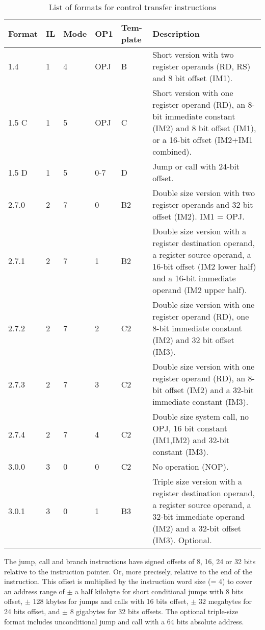 \documentclass[forwardcom.tex]{subfiles}
\begin{document}
\begin{longtable}
{|p{10mm}|p{8mm}|p{8mm}|p{8mm}|p{8mm}|p{70mm}|}
\caption{List of formats for control transfer instructions}
\label{table:jumpInstructionFormats}
\endfirsthead
\endhead
\hline
Format & IL & Mode & OP1 & Tem-plate & Description \\
\hline
1.4 & 1 & 4 & OPJ & B & Short version with two register operands (RD, RS) and 8 bit offset  (IM1).  \\
\hline
1.5 C & 1 & 5 & OPJ & C & Short version with one register operand (RD), an 8-bit immediate constant (IM2) and 8 bit offset (IM1), or a 16-bit offset (IM2+IM1 combined). \\
\hline
1.5 D & 1 & 5 & 0-7 & D & Jump or call with 24-bit offset. \\
\hline
2.7.0 & 2 & 7 & 0 & B2 & Double size version with two register operands and 32 bit offset  (IM2). IM1 = OPJ. \\
\hline
2.7.1 & 2 & 7 & 1 & B2 & Double size version with a register destination operand, a register source operand, a 16-bit offset (IM2 lower half) and a 16-bit immediate operand (IM2 upper half).  \\
\hline
2.7.2 & 2 & 7 & 2 & C2 & Double size version with one register operand (RD), one 8-bit immediate constant (IM2) and 32 bit offset (IM3). \\
\hline
2.7.3 & 2 & 7 & 3 & C2 & Double size version with one register operand (RD), an 8-bit offset (IM2) and a 32-bit immediate constant (IM3).  \\
\hline
2.7.4 & 2 & 7 & 4 & C2 & Double size system call, no OPJ, 16 bit constant (IM1,IM2) and 32-bit constant (IM3). \\
\hline
3.0.0 & 3 & 0 & 0 & C2 & No operation (NOP). \\
\hline
3.0.1 & 3 & 0 & 1 & B3 & Triple size version with a register destination operand, a register source operand, a 32-bit immediate operand (IM2) and a 32-bit offset (IM3). Optional.  \\
\hline
\end{longtable}

The jump, call and branch instructions have signed offsets of 8, 16, 24 or 32 bits relative to the instruction pointer. Or, more precisely, relative to the end of the instruction. This offset is multiplied by the instruction word size (= 4) to cover an address range of $\pm$ a half kilobyte for short conditional jumps with 8 bits offset, $\pm$ 128 kbytes for jumps and calls with 16 bits offset, $\pm$ 32 megabytes for 24 bits offset, and $\pm$ 8 gigabytes for 32 bits offsets. The optional triple-size format includes unconditional jump and call with a 64 bits absolute address.
\vspace{2mm}
\end{document}
